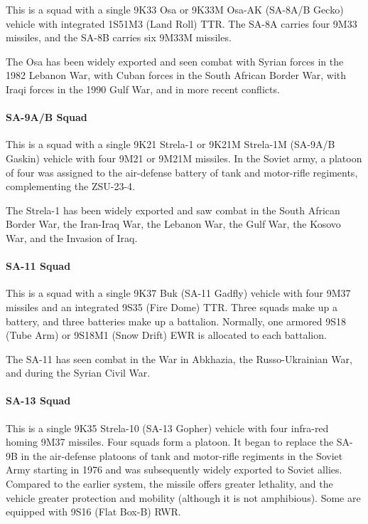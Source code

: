 This is a squad with a single 9K33 Osa or 9K33M Osa-AK (SA-8A/B Gecko) vehicle with integrated 1S51M3 (Land Roll) TTR.
The SA-8A carries four 9M33 missiles, and the SA-8B carries six 9M33M missiles.

The Osa has been widely exported and seen combat with Syrian forces in the 1982 Lebanon War, with Cuban forces in the South African Border War, with Iraqi forces in the 1990 Gulf War, and in more recent conflicts.

\paragraph{SA-9A/B Squad}

This is a squad with a single 9K21 Strela-1 or 9K21M Strela-1M (SA-9A/B Gaskin) vehicle with four 9M21 or 9M21M missiles.
In the Soviet army, a platoon of four was assigned to the air-defense battery of tank and motor-rifle regiments, complementing the ZSU-23-4.

The Strela-1 has been widely exported and saw combat in the South African Border War, the Iran-Iraq War, the Lebanon War, the Gulf War, the Kosovo War, and the Invasion of Iraq.

\paragraph{SA-11 Squad}

This is a squad with a single 9K37 Buk (SA-11 Gadfly) vehicle with four 9M37 missiles and an integrated 9S35 (Fire Dome) TTR. Three squads make up a battery, and three batteries make up a battalion. Normally, one armored 9S18 (Tube Arm) or 9S18M1 (Snow Drift) EWR is allocated to each battalion.

The SA-11 has seen combat in the War in Abkhazia, the Russo-Ukrainian War, and during the Syrian Civil War.

\paragraph{SA-13 Squad}

This is a single 9K35 Strela-10 (SA-13 Gopher) vehicle with four infra-red homing 9M37 missiles. Four squads form a platoon.
It began to replace the SA-9B in the air-defense platoons of tank and motor-rifle regiments in the Soviet Army starting in 1976 and was subsequently widely exported to Soviet allies.
Compared to the earlier system, the missile offers greater lethality, and the vehicle greater protection and mobility (although it is not amphibious).
Some are equipped with 9S16 (Flat Box-B) RWR.

